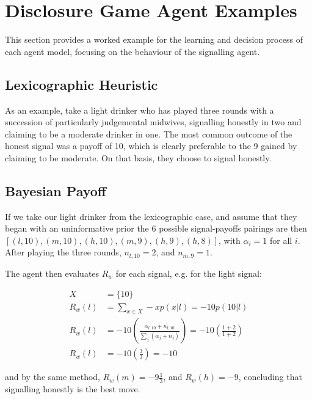 \chapter{Disclosure Game Agent Examples}
\label{sec:agent_eg}

This section provides a worked example for the learning and decision process of each agent model, focusing on the behaviour of the signalling agent.

\section{Lexicographic Heuristic}
\label{sub:lexico_eg}

As an example, take a light drinker who has played three rounds with a succession of particularly judgemental midwives, signalling honestly in two and claiming to be a moderate drinker in one. The most common outcome of the honest signal was a payoff of 10, which is clearly preferable to the 9 gained by claiming to be moderate. On that basis, they choose to signal honestly.

\section{Bayesian Payoff}
\label{sub:payoff_eg}

If we take our light drinker from the lexicographic case, and assume that they began with an uninformative prior the 6 possible signal-payoffs pairings are then \([(l,10),(m,10),(h,10),(m,9),(h,9),(h,8)]\), with \(\alpha_{i}=1\) for all \(i\). After playing the three rounds, \(n_{l,10}=2\), and \(n_{m,9}=1\).

The agent then evaluates \(R_{w}\) for each signal, e.g. for the light signal:

\begin{equation*}
\begin{aligned}
X &= \{10\}\\
R_{w}(l) &= \sum_{x \in X} -xp(x | l) = -10p(10 | l)\\
R_{w}(l) &= -10(\frac{\alpha_{l,10}+n_{l,10}}{\sum_{j}(\alpha_{j}+n_{j})}) = -10(\frac{1+2}{1+2})\\
R_{w}(l) &= -10(\frac{3}{3}) = -10
\end{aligned}
\end{equation*}

and by the same method, \(R_{w}(m)=-9\frac{1}{3}\), and \(R_{w}(h)=-9\), concluding that signalling honestly is the best move.

